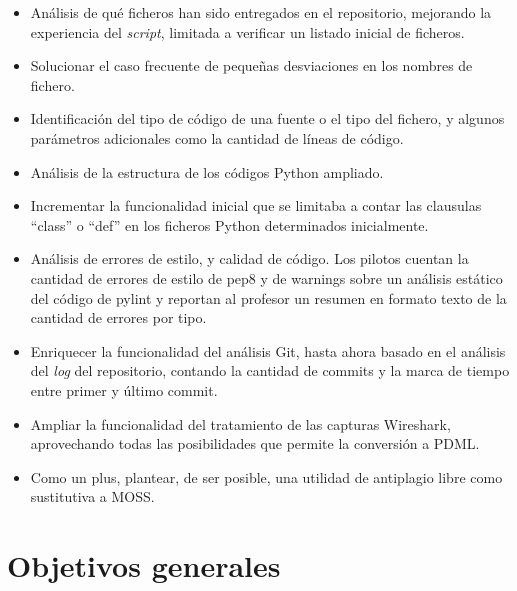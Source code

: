 \begin{itemize}
\item Análisis de qué ficheros han sido entregados en el repositorio, mejorando la experiencia del \textit{script}, limitada a verificar un listado inicial de ficheros.\\

\item Solucionar el caso frecuente de pequeñas desviaciones en los nombres de fichero.\\

\item Identificación del tipo de código de una fuente o el tipo del fichero, y algunos 	parámetros adicionales como la cantidad de líneas de código.\\

\item Análisis de la estructura de los códigos Python ampliado.\\

\item Incrementar la funcionalidad inicial que se limitaba a contar las clausulas ``class'' o ``def'' en los ficheros Python determinados inicialmente.\\

\item Análisis de errores de estilo, y calidad de código. Los pilotos cuentan la cantidad de errores de estilo de pep8 y de warnings sobre un análisis estático del código de pylint y reportan al profesor un resumen en formato texto de la cantidad de errores por tipo.\\

\item Enriquecer la funcionalidad del análisis Git, hasta ahora basado en el análisis del \textit{log} del repositorio, contando la cantidad de commits y la marca de tiempo entre primer y último commit.\\

\item Ampliar la funcionalidad del tratamiento de las capturas Wireshark, aprovechando todas las posibilidades que permite la conversión a PDML.\\

\item Como un plus, plantear, de ser posible, una utilidad de antiplagio libre como sustitutiva a MOSS.\\
\end{itemize}


\section{Objetivos generales}
\label{sec:obj_gen}


